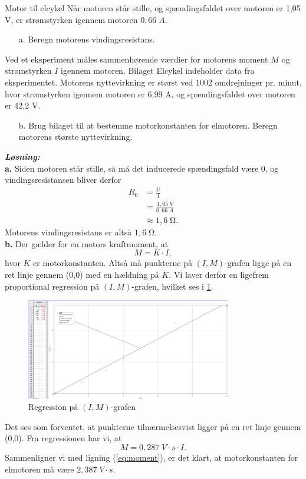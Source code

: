 \documentclass{report}
\newcommand{\sol}{\setlength{\parindent}{0cm}\textbf{\textit{Løsning:}}\setlength{\parindent}{1cm}}
\begin{document}
\begin{question}{Motor til elcykel}{}
  Når motoren står stille, og spændingsfaldet over motoren er 1,05 V, er strømstyrken igennem motoren $0,66 \;\unit{A}$.
  \begin{itemize}
    \item[a.] Beregn motorens vindingsresistans.
  \end{itemize}
Ved et eksperiment måles sammenhørende værdier for motorens moment $M$  og strømstyrken $I$ igennem motoren.
Bilaget Elcykel indeholder data fra eksperimentet.
Motorens nyttevirkning er størst ved 1002 omdrejninger pr. minut, hvor strømstyrken igennem motoren er 6,99 A, og spændingsfaldet over motoren er 42,2 V.
\begin{itemize}
  \item[b.] Brug bilaget til at bestemme motorkonstanten for elmotoren. Beregn motorens største nyttevirkning.
\end{itemize}
\end{question}
\sol \\
\textbf{a.}
Siden motoren står stille, så må det inducerede spændingsfald være 0, og vindingsresistansen bliver derfor
\begin{equation*}
\begin{split}
  R_0&=\frac{U}{I}\\
  &=\frac{1,05 \;\unit{V} }{0,66 \;\unit{A} }\\
  &\approx 1,6 \;\unit{\ohm}.
\end{split}
\end{equation*}
Motorens vindingsresistans er altså $1,6 \;\unit{\ohm}$.\\[1ex]
\textbf{b.}
Der gælder for en motors kraftmoment, at
\begin{equation}
\label{eq:moment} 
M=K \cdot I,
\end{equation}
hvor $K$ er motorkonstanten. 
Altså må punkterne på $(I, M)$-grafen ligge på en ret linje gennem (0,0) med en hældning på $K$.
Vi laver derfor en ligefrem proportional regression på $(I, M)$-grafen, hvilket ses i \cref{fig:IM}.
\begin{figure}[H]
\begin{center}
  \includegraphics[width=0.8\textwidth]{IM.png}
\end{center}
  \caption{Regression på $(I, M)$-grafen}
\label{fig:IM}
\end{figure}
Det ses som forventet, at punkterne tilnærmelsesvist ligger på en ret linje gennem (0,0).
Fra regressionen har vi, at 
\[
M=0,287 \;\unit{V \cdot s} \cdot I.
\] 
Sammenligner vi med ligning (\ref{eq:moment}), er det klart, at motorkonstanten for elmotoren må være $2,387 \;\unit{V \cdot s}$.
\end{document}
